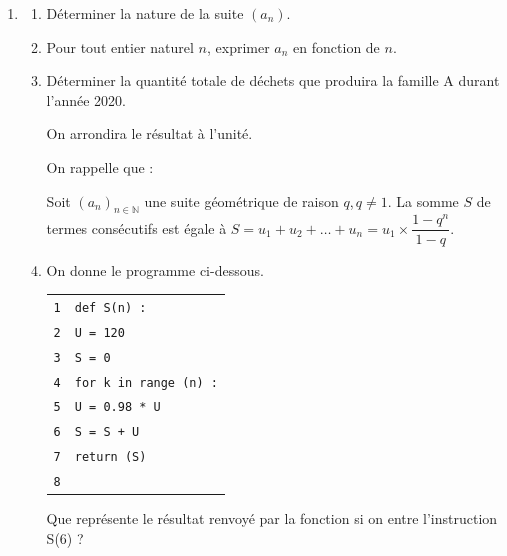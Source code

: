 \documentclass[10pt]{article}
\providecommand{\blue}{\color{blue}}
\providecommand{\N}{\mathbb{N}}
\providecommand{\blue}{\color{blue}}
\begin{document}
\begin{enumerate}[resume]
\item  
	\begin{enumerate}
		\item Déterminer la nature de la suite $\left(a_n\right)$.
		\item Pour tout entier naturel $n$, exprimer $a_n$ en fonction de $n$.
		\item Déterminer la quantité totale de déchets que produira la famille A durant l'année
2020.

On arrondira le résultat à l'unité.

On rappelle que :

Soit $\left(a_n\right)_{n\in \N}$ une suite géométrique de raison $q$,\,$ q \ne 1$. La somme $S$ de termes consécutifs est égale à $S = u_1 + u_2 +\ldots + u_n = u_1 \times \dfrac{1 - q^n}{1 - q}$.
		\item On donne le programme ci-dessous.
		












 
\begin{center}
\begin{tabular}{c l}
\texttt 1 & \texttt{{\blue def} S(n) :}\\
\texttt 2 &  \vline \quad \texttt{U = 120}\\
\texttt 3 &  \vline \quad \texttt{S = 0}\\
\texttt 4 &  \vline \quad \texttt{{\blue for} k {\blue in} range (n) :}\\
\texttt 5 &  \vline \quad \vline \quad \texttt{U = 0.98 * U}\\
\texttt 6 &  \vline \quad \vline \quad \texttt{S = S + U}\\
\texttt 7 &  \vline \quad \texttt{{\blue return} (S)}\\
\texttt 8 & 
\end{tabular}
\end{center} 
 
Que représente le résultat renvoyé par la fonction si on entre l'instruction S(6) ?
	\end{enumerate}
\end{enumerate}

\bigskip
\end{document}
